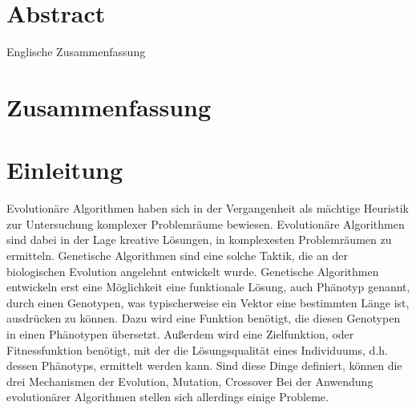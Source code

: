
\clearpage
\section*{Abstract}
Englische Zusammenfassung

\clearpage
\section*{Zusammenfassung}


\section{Einleitung}

Evolutionäre Algorithmen haben sich in der Vergangenheit als mächtige Heuristik zur Untersuchung komplexer Problemräume bewiesen.
Evolutionäre Algorithmen sind dabei in der Lage kreative Lösungen, in komplexesten Problemräumen zu ermitteln.
Genetische Algorithmen sind eine solche Taktik, die an der biologischen Evolution angelehnt entwickelt wurde.
Genetische Algorithmen entwickeln erst eine Möglichkeit eine funktionale Lösung, auch Phänotyp genannt, durch einen Genotypen, was typischerweise ein Vektor eine bestimmten Länge ist, ausdrücken zu können.
Dazu wird eine Funktion benötigt, die diesen Genotypen in einen Phänotypen übersetzt.
Außerdem wird eine Zielfunktion, oder Fitnessfunktion benötigt, mit der die Lösungsqualität eines Individuums, d.h. dessen Phänotyps, ermittelt werden kann.
Sind diese Dinge definiert, können die drei Mechanismen der Evolution, Mutation, Crossover
Bei der Anwendung evolutionärer Algorithmen stellen sich allerdings einige Probleme.

